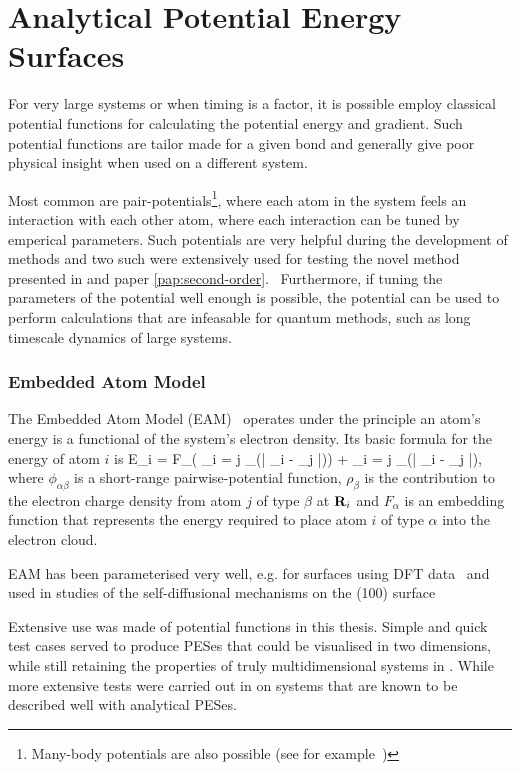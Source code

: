 \section{Analytical Potential Energy Surfaces}
\label{sec:potentials}

For very large systems or when timing is a factor, it is possible employ classical potential functions for calculating the potential energy and gradient.
Such potential functions are tailor made for a given bond and generally give poor physical insight when used on a different system.

Most common are pair-potentials\footnote{Many-body potentials are also possible (see for example~\cite{stillinger-weber-potential})}, where each atom in the system feels an interaction with each other atom, where each interaction can be tuned by emperical parameters.
Such potentials are very helpful during the development of methods and two such were extensively used for testing the novel method presented in  and paper \ref{pap:second-order}.~\cite{eam-1983, eam-1986, emt-1987, emt-1996}
Furthermore, if tuning the parameters of the potential well enough is possible, the potential can be used to perform calculations that are infeasable for quantum methods, such as long timescale dynamics of large systems.~\citemiss

\subsubsection{Embedded Atom Model}
The Embedded Atom Model (EAM)~\cite{eam-1983} operates under the principle an atom's energy is a functional of the system's electron density.
Its basic formula for the energy of atom $i$ is
E_i = F_\alpha \left( \sum_{i \not= j} \rho_\beta(\left| \vR_i - \vR_j \right|)\right) +  \sum_{i \not= j}   \phi_{\alpha\beta}(\left| \vR_i - \vR_j \right|),
\eeq
where $\phi_{\alpha\beta}$ is a short-range pairwise-potential function, $\rho_\beta$ is the contribution to the electron charge density from atom $j$ of type $\beta$ at ${\mathrm{\mathbf{\bm{R}}}}_i$ and $F_\alpha$ is an embedding function that represents the energy required to place atom $i$ of type $\alpha$ into the electron cloud.

EAM has been parameterised very well, e.g. for  surfaces using DFT data~\cite{eam-1986} and used in studies of the self-diffusional mechanisms on the (100) surface~\cite{dimer-original-1999}

Extensive use was made of potential functions in this thesis.
Simple and quick test cases served to produce PESes that could be visualised in two dimensions, while still retaining the properties of truly multidimensional systems in .
While more extensive tests were carried out in  on systems that are known to be described well with analytical PESes.

